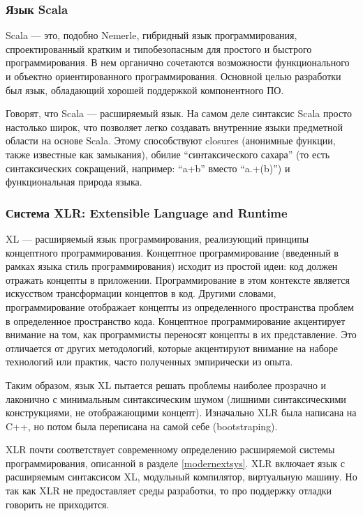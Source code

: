 \documentclass[a4paper,12pt,titlepage]{extarticle}
\begin{document}
\subsubsection*{Язык Scala}
Scala — это, подобно Nemerle, гибридный язык программирования, спроектированный
кратким и типобезопасным для простого и быстрого программирования. В нем органично
сочетаются возможности функционального и объектно ориентированного
программирования. Основной целью разработки был язык, обладающий хорошей
поддержкой компонентного ПО.

Говорят, что Scala --- расширяемый язык. На самом деле синтаксис Scala просто
настолько широк, что позволяет легко создавать внутренние языки предметной
области на основе Scala. Этому способствуют closures (анонимные функции, также
известные как замыкания), обилие ``синтаксического сахара'' (то есть
синтаксических сокращений, например: ``a+b'' вместо ``a.+(b)'') и
функциональная природа языка.

\subsubsection*{Система XLR: Extensible Language and Runtime}
\label{xlr}
XL --- расширяемый язык программирования, реализующий принципы концептного
программирования. Концептное программирование (введенный в рамках языка стиль
программирования) исходит из простой идеи: код должен отражать концепты в
приложении. Программирование в этом контексте является искусством трансформации
концептов в код. Другими словами, программирование отображает концепты из
определенного пространства проблем в определенное пространство кода. Концептное
программирование акцентирует внимание на том, как программисты переносят
концепты в их представление. Это отличается от других методологий, которые
акцентируют внимание на наборе технологий или практик, часто полученных
эмпирически из опыта.

Таким образом, язык XL пытается решать проблемы наиболее прозрачно и лаконично
с минимальным синтаксическим шумом (лишними синтаксическими конструкциями, не
отображающими концепт).
Изначально XLR была написана на C++, но потом была переписана на самой себе
(bootstraping).

XLR почти соответствует современному определению расширяемой системы
программирования, описанной в разделе \ref{modernextsys}. XLR включает язык с
расширяемым синтаксисом XL, модульный компилятор, виртуальную машину. Но так как
XLR не предоставляет среды разработки, то про поддержку отладки говорить не
приходится.
\end{document}
